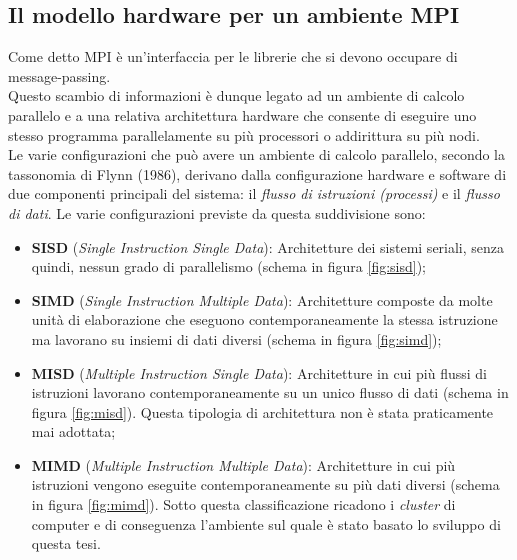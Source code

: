 \subsection{Il modello hardware per un ambiente MPI}\label{subsubsec:mpi_hw_model}
Come detto MPI è un'interfaccia per le librerie che si devono occupare di message-passing.\\
Questo scambio di informazioni è dunque legato ad un ambiente di calcolo parallelo e a una relativa architettura hardware che consente di eseguire uno stesso programma parallelamente su più processori o addirittura su più nodi.\\
Le varie configurazioni che può avere un ambiente di calcolo parallelo, secondo la tassonomia di Flynn (1986), derivano dalla configurazione hardware e software di due componenti principali del sistema: il \emph{flusso di istruzioni (processi)} e il \emph{flusso di dati}. Le varie configurazioni previste da questa suddivisione sono:
\begin{itemize}
	\item \textbf{SISD} (\textit{Single Instruction Single Data}): Architetture dei sistemi seriali, senza quindi, nessun grado di parallelismo (schema in figura \ref{fig:sisd});
	\item \textbf{SIMD} (\textit{Single Instruction Multiple Data}): Architetture composte da molte unità di elaborazione che eseguono contemporaneamente la stessa istruzione ma lavorano su insiemi di dati diversi (schema in figura \ref{fig:simd});
	\item \textbf{MISD} (\textit{Multiple Instruction Single Data}): Architetture in cui più flussi di istruzioni lavorano contemporaneamente su un unico flusso di dati (schema in figura \ref{fig:misd}). Questa tipologia di architettura non è stata praticamente mai adottata;
	\item \textbf{MIMD} (\textit{Multiple Instruction Multiple Data}): Architetture in cui più istruzioni vengono eseguite contemporaneamente su più dati diversi (schema in figura \ref{fig:mimd}). Sotto questa classificazione ricadono i \textit{cluster} di computer e di conseguenza l'ambiente sul quale è stato basato lo sviluppo di questa tesi.
\end{itemize}

